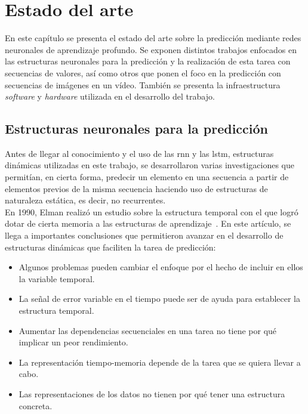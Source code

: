 \chapter{Estado del arte}\label{cap.estado}
En este capítulo se presenta el estado del arte sobre la predicción mediante redes neuronales de aprendizaje profundo. Se exponen distintos trabajos enfocados en las estructuras neuronales para la predicción y la realización de esta tarea con secuencias de valores, así como otros que ponen el foco en la predicción con secuencias de imágenes en un vídeo. También se presenta la infraestructura \textit{software} y \textit{hardware} utilizada en el desarrollo del trabajo.\\

\section{Estructuras neuronales para la predicción}
Antes de llegar al conocimiento y el uso de las \acrshort{rnn} y las \acrshort{lstm}, estructuras dinámicas utilizadas en este trabajo, se desarrollaron varias investigaciones que permitían, en cierta forma, predecir un elemento en una secuencia a partir de elementos previos de la misma secuencia haciendo uso de estructuras de naturaleza estática, es decir, no recurrentes.\\

En 1990, Elman realizó un estudio sobre la estructura temporal con el que logró dotar de cierta memoria a las estructuras de aprendizaje~\cite{elman1990finding}. En este artículo, se llega a importantes conclusiones que permitieron avanzar en el desarrollo de estructuras dinámicas que faciliten la tarea de predicción: 

\begin{itemize}
    \item Algunos problemas pueden cambiar el enfoque por el hecho de incluir en ellos la variable temporal.
    \item La señal de error variable en el tiempo puede ser de ayuda para establecer la estructura temporal.
    \item Aumentar las dependencias secuenciales en una tarea no tiene por qué implicar un peor rendimiento.
    \item La representación tiempo-memoria depende de la tarea que se quiera llevar a cabo.
    \item Las representaciones de los datos no tienen por qué tener una estructura concreta.
\end{itemize}

